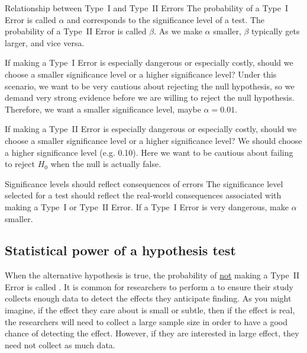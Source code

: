 \begin{onebox}{Relationship between Type~I and Type~II Errors}
The probability of a Type~I Error is called $\alpha$ and corresponds to the significance level of a test. The probability of a Type~II Error is called $\beta$. As we make $\alpha$ smaller, $\beta$ typically gets larger, and vice versa.\end{onebox}

\begin{examplewrap}
\begin{nexample}{If making a Type~I Error is especially dangerous or especially costly, should we choose a smaller significance level or a higher significance level?}
Under this scenario, we want to be very cautious about rejecting the null hypothesis, so we demand very strong evidence before we are willing to reject the null hypothesis. Therefore, we want a smaller significance level, maybe $\alpha = 0.01$.
\end{nexample}
\end{examplewrap}

\begin{examplewrap}
\begin{nexample}{If making a Type~II Error is especially dangerous or especially costly, should we choose a smaller significance level or a higher significance level?}
We should choose a higher significance level (e.g. 0.10). Here we want to be cautious about failing to reject $H_0$ when the null is actually false.
\end{nexample}
\end{examplewrap}

\begin{onebox}{Significance levels should reflect consequences of errors}
The significance level selected for a test should reflect the real-world consequences associated with making a Type~I or Type~II Error. If a Type~I Error is very dangerous, make $\alpha$ smaller.\end{onebox}



\subsection{Statistical power of a hypothesis test}

When the alternative hypothesis is true, the probability of \underline{not} making a Type~II Error is called . It is common for researchers to perform a  to ensure their study collects enough data to detect the effects they anticipate finding. As you might imagine, if the effect they care about is small or subtle, then if the effect is real, the researchers will need to collect a large sample size in order to have a good chance of detecting the effect. However, if they are interested in large effect, they need not collect as much data.

